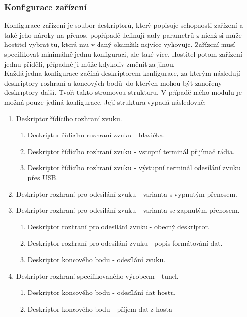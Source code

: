 \subsubsection{Konfigurace zařízení}
Konfigurace zařízení je soubor deskriptorů, který popisuje schopnosti zařízení a také jeho nároky na přenos, popřípadě definují sady parametrů z nichž si může hostitel vybrat tu, která mu v daný okamžik nejvíce vyhovuje. Zařízení musí specifikovat minimálně jednu konfiguraci, ale také více. Hostitel potom zařízení jednu přidělí, případně ji může kdykoliv změnit za jinou.\\
Každá jedna konfigurace začíná deskriptorem konfigurace, za kterým následují deskriptory rozhraní a koncových bodů, do kterých mohou být zanořeny deskriptory další. Tvoří takto stromovou strukturu. V případě mého modulu je možná pouze jediná konfigurace. Její struktura vypadá následovně:
\begin{enumerate}
\item Deskriptor řídícího rozhraní zvuku.
	\begin{enumerate}
	\item Deskriptor řídícího rozhraní zvuku - hlavička.
	\item Deskriptor řídícího rozhraní zvuku - vstupní terminál přijímač rádia.
	\item Deskriptor řídícího rozhraní zvuku - výstupní terminál odesílání zvuku přes USB.
	\end{enumerate}
\item Deskriptor rozhraní pro odesílání zvuku - varianta s vypnutým přenosem.
\item Deskriptor rozhraní pro odesílání zvuku - varianta se zapnutým přenosem.
	\begin{enumerate}
	\item Deskriptor rozhraní pro odesílání zvuku - obecný deskriptor.
	\item Deskriptor rozhraní pro odesílání zvuku - popis formátování dat.
	\item Deskriptor koncového bodu - odesílání zvuku.
	\end{enumerate}
\item Deskriptor rozhraní specifikovaného výrobcem - \iic tunel.
	\begin{enumerate}
	\item Deskriptor koncového bodu - odesílání dat hostu.
	\item Deskriptor koncového bodu - příjem dat z hosta.
	\end{enumerate}
\end{enumerate}


